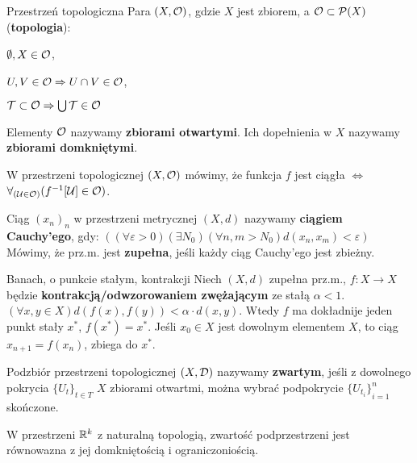 \begin{definicja}{Przestrzeń topologiczna}
    Para $(X, \mathcal{O})$, gdzie $X$ jest zbiorem, a $\mathcal{O} \subset \mathcal{P}(X)$ (\textbf{topologia}):
    \begin{enumerate*}[label=\roman*]
        \item $\emptyset, X \in \mathcal{O}$,
        \item $U, V \in \mathcal{O} \Rightarrow U \cap V \in \mathcal{O}$,
        \item $\mathcal{T} \subset \mathcal{O} \Rightarrow \bigcup\mathcal{T} \in \mathcal{O}$
    \end{enumerate*}
    Elementy $\mathcal{O}$ nazywamy \textbf{zbiorami otwartymi}. Ich dopełnienia w $X$ nazywamy \textbf{zbiorami domkniętymi}.
\end{definicja}

\begin{definicja}
    W przestrzeni topologicznej $(X, \mathcal{O})$ mówimy, że funkcja $f$ jest ciągła $\Leftrightarrow$ $\forall_{(\mathcal{U} \in \mathcal{O})}(f^{-1}[\mathcal{U}] \in \mathcal{O})$.
\end{definicja}

\begin{definicja}
    Ciąg ${(x_{n})}_{n}$ w przestrzeni 
    metrycznej 
    $(X, d)$ nazywamy \textbf{ciągiem Cauchy'ego}, 
    gdy:
    $((\forall \varepsilon > 0)(\exists N_0)(\forall n, m > N_0) d(x_n, x_m) < \varepsilon)$
    Mówimy, że prz.m. jest \textbf{zupełna}, jeśli każdy ciąg Cauchy'ego jest zbieżny.
\end{definicja}

\begin{twierdzenie}{Banach, o punkcie stałym, kontrakcji}
    Niech $(X, d)$ zupełna prz.m., $f: X \rightarrow X$ będzie \textbf{kontrakcją/odwzorowaniem zwężającym} ze stałą $\alpha < 1$.
    $(\forall x, y \in X)d(f(x), f(y)) < \alpha\cdot d(x, y)$. Wtedy $f$ ma dokładnije jeden punkt stały $x^*$, $f(x^*)=x^*$.
    Jeśli $x_0 \in X$ jest dowolnym elementem $X$, to ciąg $x_{n+1} = f(x_n)$, zbiega do $x^*$.
\end{twierdzenie}

\begin{definicja}
    Podzbiór przestrzeni topologicznej $(X, \mathcal{D})$ nazywamy \textbf{zwartym}, jeśli z dowolnego pokrycia ${\{U_t\}}_{t\in T}$
    $X$ zbiorami otwartmi, można wybrać podpokrycie ${\{U_{t_i}\}}_{i = 1}^{n}$ skończone.
\end{definicja}

\begin{fakt}
    W przestrzeni $\mathbb{R}^k$ z naturalną topologią, zwartość podprzestrzeni jest równowazna z jej domkniętością i ograniczoniością.
\end{fakt}

